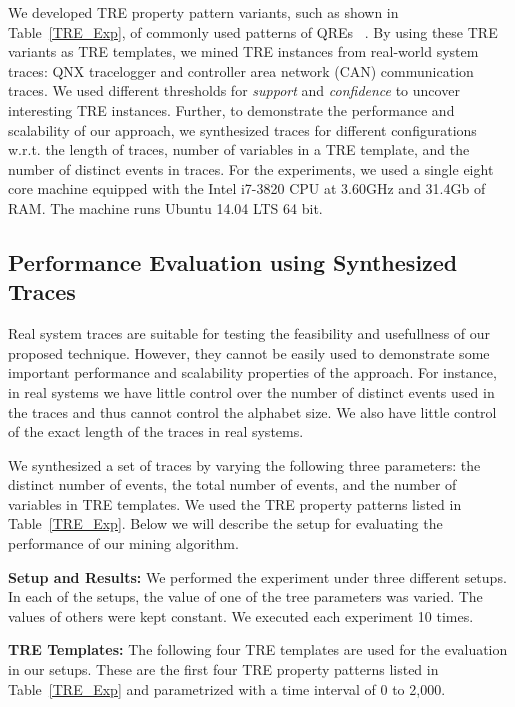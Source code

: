 \documentclass[]{sigplanconf}
\begin{document}
We developed TRE property pattern variants, such as shown in Table~\ref{TRE_Exp}, of commonly used patterns of QREs ~\cite{DBLP:conf/paste/YangE04}. By using these TRE variants as TRE templates, we mined TRE instances from real-world system traces: QNX tracelogger and controller area network (CAN) communication traces. We used different thresholds for \emph{support} and \emph{confidence} to uncover interesting TRE instances. Further, to demonstrate the performance and scalability of our approach, we synthesized traces for different configurations w.r.t. the length of traces, number of variables in a TRE template, and the number of distinct events in traces. For the experiments, we used a single eight core machine equipped with the Intel i7-3820 CPU at 3.60GHz and 31.4Gb of RAM. The machine runs Ubuntu 14.04 LTS 64 bit.

\subsection{Performance Evaluation using Synthesized Traces}

Real system traces are suitable for testing the feasibility and usefullness of our proposed technique. However, they cannot be easily used to demonstrate some important performance and scalability properties of the approach. For instance, in real systems we have little control over the number of distinct events used in the traces and thus cannot control the alphabet size. We also have little control of the exact length of the traces in real systems.


We synthesized a set of traces by varying the following three parameters: the distinct number of events, the total number of events, and the number of variables in TRE templates. We used the TRE property patterns listed in Table~\ref{TRE_Exp}.
Below we will describe the setup for evaluating the performance of our mining algorithm.

\vspace{3mm}

\noindent \textbf{Setup and Results:} We performed the experiment under three different setups. In each of the setups, the value of one of the tree parameters was varied. The values of others were kept constant. We executed each experiment 10 times.

\vspace{3mm}

\noindent \textbf{TRE Templates:} The following four TRE templates are used for the evaluation in our setups. These are the first four TRE property patterns listed in Table~\ref{TRE_Exp} and parametrized with a time interval of 0 to 2,000.
\vspace{2mm}
\end{document}
